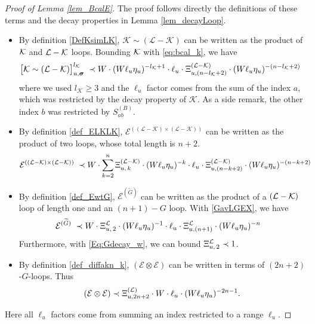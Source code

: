 \documentclass[10pt,reqno]{article}
\theoremstyle{plain} %
\theoremstyle{remark}
\numberwithin{equation}{section}
\begin{document}
 \begin{proof}[Proof of Lemma \ref{lem_BcalE}] The proof  follows directly  the definitions of these  terms  %
 and the decay properties in Lemma \ref{lem_decayLoop}.  
     \begin{itemize}
    \item By definition \eqref{DefKsimLK},  $\mathcal{K} \sim(\mathcal{L}-\mathcal{K})$ can be written as the product of $\cal K$  and $\cal L-\cal K$ loops.   Bounding  $\cal K$  with \eqref{eq:bcal_k}, we have  
    \begin{align}
    \big[\mathcal{K} \sim(\mathcal{L}-\mathcal{K})\big]_{u, \boldsymbol{\sigma}}^{l_{\mathcal{K}}}
 \; \prec \; &
 W\cdot (W\ell_u\eta_u)^{-l_{\mathcal{K}}+1}\cdot \ell_u\cdot \Xi^{(\cal L-\cal K)}_{u,(n-l_{\mathcal{K}}+2)}\cdot (W\ell_u\eta_u)^{-(n-l_{\mathcal{K}}+2)}
    \end{align}
    where we used $l_{\mathcal{K}}\ge 3$ and the $\ell_u$ factor comes from the sum of the index $a$, which was restricted by the decay property of $\mathcal K$. 
    As a side remark, the other index  $b$ was restricted by    $S^{(B)}_{ab}$. 
    
    \item By  definition \eqref{def_ELKLK},  $ \mathcal{E}^{((\mathcal{L} - \mathcal{K}) \times (\mathcal{L} - \mathcal{K}))}$ can be written as the product of two loops, whose total length is $n+2$.
    \begin{align}
   \mathcal{E}^{((\mathcal{L} - \mathcal{K}) \times (\mathcal{L} - \mathcal{K}))}
 \; \prec \; &
 W\cdot \sum_{k=2}^{n} \Xi^{(\cal L-\cal K)}_{u, \,k}
 \cdot (W\ell_u\eta_u)^{-k}
 \cdot \ell_u\cdot \Xi^{(\cal L-\cal K)}_{u,(n-k+2)}
 \cdot (W\ell_u\eta_u)^{-(n-k+2)}
      \end{align}
    
    \item By definition \eqref{def_EwtG}, 
    $\mathcal{E}^{(\widetilde{G})}$  can be written as the product of  a  $(\cal L-\cal K)$ loop of length one and an  $(n+1)-G$  loop. With  \eqref{GavLGEX}, we have 
    \begin{align}
  \mathcal{E}^{(\widetilde{G})}
 \; \prec \; &
 W\cdot   \Xi^{\cal L }_{u, \,2}
 \cdot (W\ell_u\eta_u)^{-1}
 \cdot \ell_u\cdot \Xi^{\cal L }_{u,(n+1)}
 \cdot (W\ell_u\eta_u)^{-n} 
    \end{align} 
    Furthermore, with \eqref{Eq:Gdecay_w}, we can bound $\Xi^{\cal L }_{u, \,2}\prec 1$. 
 \item By definition  \eqref{def_diffakn_k}, 
    $(\mathcal{E} \otimes \mathcal{E})$ can be written in terms of  $(2n+2)$-$G$-loops.  Thus 
    \begin{align}
(\mathcal{E} \otimes \mathcal{E}) \prec  \Xi^{(\cal L)}_{u, {2n+2}}\cdot  W\cdot\ell_u\cdot (W\ell_u\eta_u)^{-2n-1 } .
    \end{align} 
\end{itemize}
Here all  $\ell_u$ factors  come from summing an index restricted to a range $\ell_u$. 
 \end{proof}
  
\end{document}
